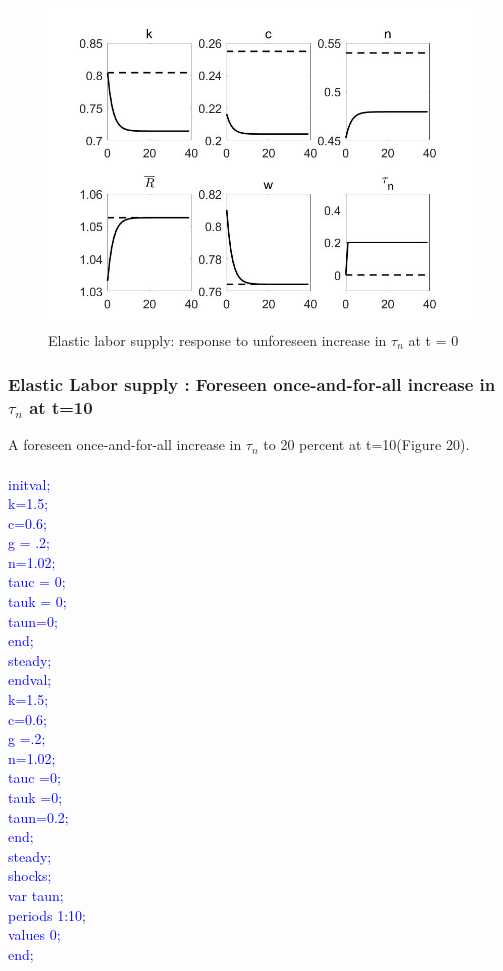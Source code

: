 \documentclass[a4paper,12pt]{scrartcl} %
\begin{document}
\begin{figure}[htbp!]
		\centering
			\includegraphics[width=0.8\linewidth]{fig19.jpg}
            \caption{Elastic labor supply: response to unforeseen increase in $\tau_n$ at t = 0}\label{10}
\end{figure}

\subsubsection{Elastic Labor supply : Foreseen once-and-for-all increase in $\tau_n$ at t=10}

A foreseen once-and-for-all increase in $\tau_n$ to 20 percent at t=10(Figure 20).\\
\\
\textcolor{blue}{
initval;\\
k=1.5;\\
c=0.6;\\
g = .2;\\
n=1.02;\\
tauc = 0;\\
tauk = 0;\\
taun=0;\\
end;\\
steady;\\
endval;\\
k=1.5;\\
c=0.6;\\
g =.2;\\
n=1.02;\\
tauc =0;\\
tauk =0;\\
taun=0.2;\\
end;\\
steady;\\
shocks;\\
var taun;\\
periods 1:10;\\
values 0;\\
end;}\\
\end{document}
